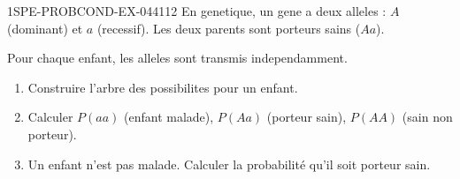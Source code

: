 \begin{exercice}{1SPE-PROBCOND-EX-044}{1}{12}
En genetique, un gene a deux alleles : $A$ (dominant) et $a$ (recessif). Les deux parents sont porteurs sains ($Aa$).

Pour chaque enfant, les alleles sont transmis independamment.

\begin{enumerate}
  \item Construire l'arbre des possibilites pour un enfant.
  \item Calculer $P(aa)$ (enfant malade), $P(Aa)$ (porteur sain), $P(AA)$ (sain non porteur).
  \item Un enfant n'est pas malade. Calculer la probabilité qu'il soit porteur sain.
\end{enumerate}
\end{exercice}
